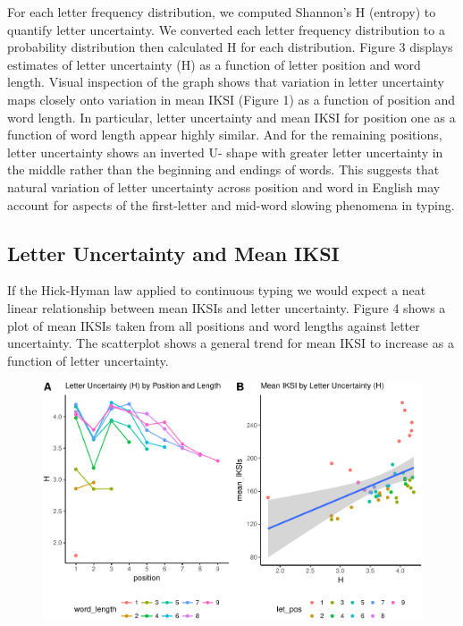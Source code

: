 \documentclass[floatsintext,man]{apa6}
\theoremstyle{definition}
\theoremstyle{definition}
\theoremstyle{definition}
\theoremstyle{remark}
\begin{document}
For each letter frequency distribution, we computed Shannon's H
(entropy) to quantify letter uncertainty. We converted each letter
frequency distribution to a probability distribution then calculated H
for each distribution. Figure 3 displays estimates of letter uncertainty
(H) as a function of letter position and word length. Visual inspection
of the graph shows that variation in letter uncertainty maps closely
onto variation in mean IKSI (Figure 1) as a function of position and
word length. In particular, letter uncertainty and mean IKSI for
position one as a function of word length appear highly similar. And for
the remaining positions, letter uncertainty shows an inverted U- shape
with greater letter uncertainty in the middle rather than the beginning
and endings of words. This suggests that natural variation of letter
uncertainty across position and word in English may account for aspects
of the first-letter and mid-word slowing phenomena in typing.

\subsection{Letter Uncertainty and Mean
IKSI}\label{letter-uncertainty-and-mean-iksi}

If the Hick-Hyman law applied to continuous typing we would expect a
neat linear relationship between mean IKSIs and letter uncertainty.
Figure 4 shows a plot of mean IKSIs taken from all positions and word
lengths against letter uncertainty. The scatterplot shows a general
trend for mean IKSI to increase as a function of letter uncertainty.

\begin{figure}[htbp]
\centering
\includegraphics{Entropy_typing_draft_files/figure-latex/letter_uncertainty_by_IKSI-1.pdf}
\caption{}
\end{figure}
\end{document}
